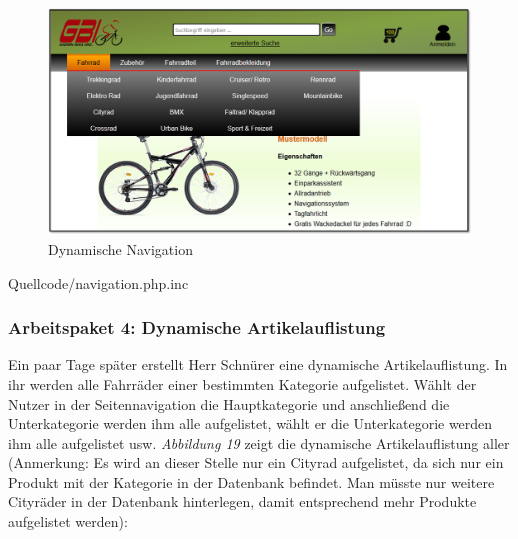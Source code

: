 \vfill

\begin{figure}[H]
\begin{center}
\includegraphics[width=12cm]{Bilder/Abbildung9-DynamischeNaviagtionDesWebshops.png}
\end{center}
\caption{Dynamische Navigation}
\label{Abbildung9-Dynamische Navigation}
\end{figure}

\vfill

\newpage
\begin{center}
	\begin{lstinputlisting}[language=PHP, caption={Auszug aus der Klasse Navigation - Die dynamische Seitennavigation}]
		{Quellcode/navigation.php.inc}
	\end{lstinputlisting}
\end{center}

\newpage
\subsubsection{Arbeitspaket 4: Dynamische Artikelauflistung}

Ein paar Tage später erstellt Herr Schnürer eine dynamische Artikelauflistung. In ihr werden alle Fahrräder einer bestimmten Kategorie aufgelistet. Wählt der Nutzer in der Seitennavigation die Hauptkategorie \grqq{} und anschließend die Unterkategorie \grqq{} werden ihm alle \grqq{} aufgelistet, wählt er die Unterkategorie \grqq{} werden ihm alle \grqq{} aufgelistet usw. \textit{Abbildung 19} zeigt die dynamische Artikelauflistung aller \grqq{} (Anmerkung: Es wird an dieser Stelle nur ein Cityrad aufgelistet, da sich nur ein Produkt mit der Kategorie \grqq{} in der Datenbank befindet. Man müsste nur weitere Cityräder in der Datenbank hinterlegen, damit entsprechend mehr Produkte aufgelistet werden):

